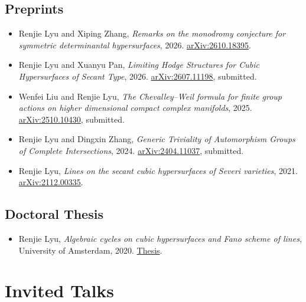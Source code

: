 \documentclass[letterpaper]{article}
\begin{document}
\subsection*{Preprints}
\begin{itemize}
\item Renjie Lyu and Xiping Zhang, \textit{Remarks on the monodromy conjecture
for symmetric determinantal hypersurfaces}, 2026.
\href{https://arxiv.org/abs/2610.18395}{arXiv:2610.18395}.

\item Renjie Lyu and Xuanyu Pan, \textit{Limiting Hodge Structures for Cubic
Hypersurfaces of Secant Type}, 2026.
\href{https://arxiv.org/abs/2607.11198}{arXiv:2607.11198}, submitted.

\item Wenfei Liu and Renjie Lyu, \textit{The Chevalley--Weil formula for finite
group actions on higher dimensional compact complex manifolds}, 2025.
\href{https://arxiv.org/abs/2510.10430}{arXiv:2510.10430}, submitted.

\item Renjie Lyu and Dingxin Zhang, \textit{Generic Triviality of Automorphism
Groups of Complete Intersections}, 2024.
\href{https://arxiv.org/abs/2404.11037}{arXiv:2404.11037}, submitted.

\item Renjie Lyu, \textit{Lines on the secant cubic hypersurfaces of Severi
varieties}, 2021. \href{https://arxiv.org/abs/2112.00335}{arXiv:2112.00335}.
\end{itemize}

\subsection*{Doctoral Thesis}
\begin{itemize}
\item Renjie Lyu, \textit{Algebraic cycles on cubic hypersurfaces and Fano scheme
of lines}, University of Amsterdam, 2020.
\href{https://pure.uva.nl/ws/files/50986723/Thesis.pdf}{Thesis}.
\end{itemize}

\section*{Invited Talks}
\end{document}
